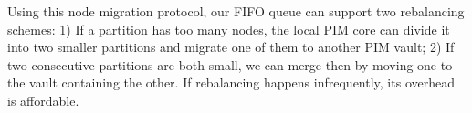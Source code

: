 Using this node migration protocol, our FIFO queue can support two rebalancing schemes:
1) If a partition has too many nodes, the local PIM core can divide it into two smaller  
partitions and migrate one of them to another PIM vault; 
2) If two consecutive partitions are both small, 
we can merge then by moving one to the vault containing the other. 
If rebalancing happens infrequently, its overhead is affordable. 

